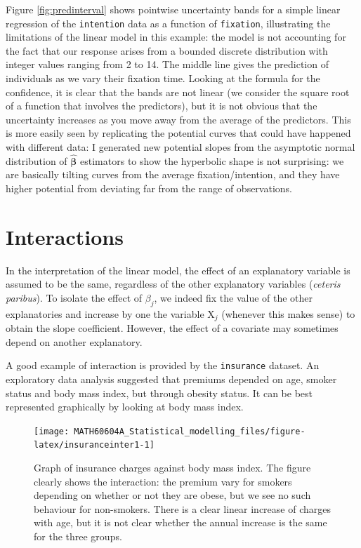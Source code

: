 \documentclass[
  11pt,
  letterpaper,
]{book}
\theoremstyle{definition}
\theoremstyle{definition}
\theoremstyle{definition}
\theoremstyle{remark}
\begin{document}
Figure \ref{fig:predinterval} shows pointwise uncertainty bands for a simple linear regression of the \texttt{intention} data as a function of \texttt{fixation}, illustrating the limitations of the linear model in this example: the model is not accounting for the fact that our response arises from a bounded discrete distribution with integer values ranging from 2 to 14. The middle line gives the prediction of individuals as we vary their fixation time. Looking at the formula for the confidence, it is clear that the bands are not linear (we consider the square root of a function that involves the predictors), but it is not obvious that the uncertainty increases as you move away from the average of the predictors. This is more easily seen by replicating the potential curves that could have happened with different data: I generated new potential slopes from the asymptotic normal distribution of \(\widehat{\boldsymbol{\beta}}\) estimators to show the hyperbolic shape is not surprising: we are basically tilting curves from the average fixation/intention, and they have higher potential from deviating far from the range of observations.

\hypertarget{interactions}{%
\section{Interactions}\label{interactions}}

In the interpretation of the linear model, the effect of an explanatory variable is assumed to be the same, regardless of the other explanatory variables (\emph{ceteris paribus}). To isolate the effect of \(\beta_j\), we indeed fix the value of the other explanatories and increase by one the variable \(\mathrm{X}_j\) (whenever this makes sense) to obtain the slope coefficient. However, the effect of a covariate may sometimes depend on another explanatory.

A good example of interaction is provided by the \texttt{insurance} dataset. An exploratory data analysis suggested that premiums depended on age, smoker status and body mass index, but through obesity status. It can be best represented graphically by looking at body mass index.

\begin{figure}

{\centering \texttt{[image: MATH60604A\_Statistical\_modelling\_files/figure-latex/insuranceinter1-1]} 

}

\caption{Graph of insurance charges against body mass index. The figure clearly shows the interaction: the premium vary for smokers depending on whether or not they are obese, but we see no such behaviour for non-smokers. There is a clear linear increase of charges with age, but it is not clear whether the annual increase is the same for the three groups.}\label{fig:insuranceinter1}
\end{figure}
\end{document}
